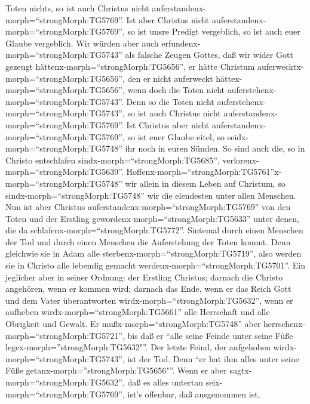Toten nichts, so ist auch Christus nicht
auferstandenx-morph=``strongMorph:TG5769''.  Ist aber
Christus nicht auferstandenx-morph=``strongMorph:TG5769'', so ist unsre
Predigt vergeblich, so ist auch euer Glaube vergeblich. 
Wir würden aber auch erfundenx-morph=``strongMorph:TG5743'' als falsche
Zeugen Gottes, daß wir wider Gott gezeugt
hättenx-morph=``strongMorph:TG5656'', er hätte Christum
auferwecktx-morph=``strongMorph:TG5656'', den er nicht auferweckt
hättex-morph=``strongMorph:TG5656'', wenn doch die Toten nicht
auferstehenx-morph=``strongMorph:TG5743''.  Denn so die
Toten nicht auferstehenx-morph=``strongMorph:TG5743'', so ist auch
Christus nicht auferstandenx-morph=``strongMorph:TG5769''. 
Ist Christus aber nicht auferstandenx-morph=``strongMorph:TG5769'', so
ist euer Glaube eitel, so seidx-morph=``strongMorph:TG5748'' ihr noch in
euren Sünden.  So sind auch die, so in Christo entschlafen
sindx-morph=``strongMorph:TG5685'',
verlorenx-morph=``strongMorph:TG5639''. 
Hoffenx-morph=``strongMorph:TG5761''x-morph=``strongMorph:TG5748'' wir
allein in diesem Leben auf Christum, so
sindx-morph=``strongMorph:TG5748'' wir die elendesten unter allen
Menschen.  Nun ist aber Christus
auferstandenx-morph=``strongMorph:TG5769'' von den Toten und der
Erstling gewordenx-morph=``strongMorph:TG5633'' unter denen, die da
schlafenx-morph=``strongMorph:TG5772''.  Sintemal durch
einen Menschen der Tod und durch einen Menschen die Auferstehung der
Toten kommt.  Denn gleichwie sie in Adam alle
sterbenx-morph=``strongMorph:TG5719'', also werden sie in Christo alle
lebendig gemacht werdenx-morph=``strongMorph:TG5701''.  Ein
jeglicher aber in seiner Ordnung: der Erstling Christus; darnach die
Christo angehören, wenn er kommen wird;  darnach das Ende,
wenn er das Reich Gott und dem Vater überantworten
wirdx-morph=``strongMorph:TG5632'', wenn er aufheben
wirdx-morph=``strongMorph:TG5661'' alle Herrschaft und alle Obrigkeit
und Gewalt.  Er mußx-morph=``strongMorph:TG5748'' aber
herrschenx-morph=``strongMorph:TG5721'', bis daß er ``alle seine Feinde
unter seine Füße legex-morph=''strongMorph:TG5632"''.  Der
letzte Feind, der aufgehoben wirdx-morph=``strongMorph:TG5743'', ist der
Tod.  Denn ``er hat ihm alles unter seine Füße
getanx-morph=''strongMorph:TG5656"''. Wenn er aber
sagtx-morph=``strongMorph:TG5632'', daß es alles untertan
seix-morph=``strongMorph:TG5769'', ist's offenbar, daß ausgenommen ist,
